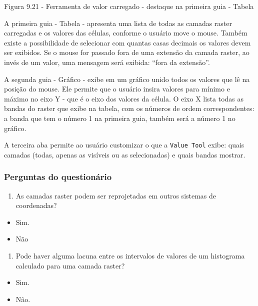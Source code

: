 \documentclass[
]{book}
\providecommand{\tightlist}{%
  \setlength{\itemsep}{0pt}\setlength{\parskip}{0pt}}
\begin{document}
Figura 9.21 - Ferramenta de valor carregado - destaque na primeira guia - Tabela

A primeira guia - Tabela - apresenta uma lista de todas as camadas raster carregadas e os valores das células, conforme o usuário move o mouse. Também existe a possibilidade de selecionar com quantas casas decimais os valores devem ser exibidos. Se o mouse for passado fora de uma extensão da camada raster, ao invés de um valor, uma mensagem será exibida: ``fora da extensão''.

A segunda guia - Gráfico - exibe em um gráfico unido todos os valores que lê na posição do mouse. Ele permite que o usuário insira valores para mínimo e máximo no eixo Y - que é o eixo dos valores da célula. O eixo X lista todas as bandas do raster que exibe na tabela, com os números de ordem correspondentes: a banda que tem o número 1 na primeira guia, também será a número 1 no gráfico.

A terceira aba permite ao usuário customizar o que a \texttt{Value\ Tool} exibe: quais camadas (todas, apenas as visíveis ou as selecionadas) e quais bandas mostrar.

\hypertarget{perguntas-do-questionuxe1rio-18}{%
\subsubsection{\texorpdfstring{\textbf{Perguntas do questionário}}{Perguntas do questionário}}\label{perguntas-do-questionuxe1rio-18}}

\begin{enumerate}
\def\labelenumi{\arabic{enumi}.}
\tightlist
\item
  As camadas raster podem ser reprojetadas em outros sistemas de coordenadas?
\end{enumerate}

\begin{itemize}
\tightlist
\item
  { Sim. }
\item
  Não
\end{itemize}

\begin{enumerate}
\def\labelenumi{\arabic{enumi}.}
\setcounter{enumi}{1}
\tightlist
\item
  Pode haver alguma lacuna entre os intervalos de valores de um histograma calculado para uma camada raster?
\end{enumerate}

\begin{itemize}
\tightlist
\item
  Sim.
\item
  { Não. }
\end{itemize}
\end{document}
